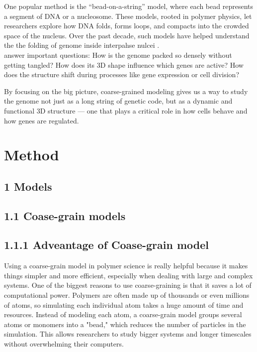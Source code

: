 \documentclass[12pt]{article}
\begin{document}
\begin{flushleft}
One popular method is the “bead-on-a-string” model, where each bead represents a segment of DNA or a nucleosome. These models, rooted in polymer physics, let researchers explore how DNA folds, forms loops, and compacts into the crowded space of the nucleus. Over the past decade, such models have helped understand the the folding of genome inside interpahse nulcei \cite{Lizana2024}.\\



answer important questions: How is the genome packed so densely without getting tangled? How does its 3D shape influence which genes are active? How does the structure shift during processes like gene expression or cell division?

By focusing on the big picture, coarse-grained modeling gives us a way to study the genome not just as a long string of genetic code, but as a dynamic and functional 3D structure — one that plays a critical role in how cells behave and how genes are regulated.



\section*{Method} 
\subsection*{1 Models}
\subsection*{1.1 Coase-grain models}

\subsection*{1.1.1 Adveantage of Coase-grain model}



	Using a coarse-grain model in polymer science is really helpful because it makes things simpler and more efficient, especially when dealing with large and complex systems. One of the biggest reasons to use coarse-graining is that it saves a lot of computational power. Polymers are often made up of thousands or even millions of atoms, so simulating each individual atom takes a huge amount of time and resources. Instead of modeling each atom, a coarse-grain model groups several atoms or monomers into a "bead," which reduces the number of particles in the simulation. This allows researchers to study bigger systems and longer timescales without overwhelming their computers.


\end{flushleft}
\end{document}

